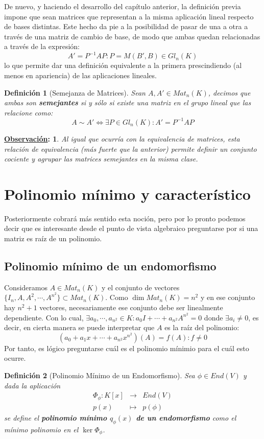 \documentclass[10pt,a4paper,openright]{book}
\theoremstyle{break}
\newtheorem*{defi}{Definición}
\newtheorem*{obs}{\underline{Observación}:}
\begin{document}
De nuevo, y haciendo el desarrollo del capítulo anterior, la definición previa impone que sean matrices que representan a la misma aplicación lineal respecto de bases distintas. Este hecho da pie a la posibilidad de pasar de una a otra a través de una matriz de cambio de base, de modo que ambas quedan relacionadas a través de la expresión:
$$
A'= P^{-1}AP: P=M(B',B)\in Gl_n(K)
$$
lo que permite dar una definición equivalente a la primera prescindiendo (al menos en apariencia) de las aplicaciones lineales.

\begin{defi}[Semejanza de Matrices]
Sean $A,A'\in Mat_{n}(K)$, decimos que ambas son \textbf{semejantes} si y sólo si existe una matriz en el grupo lineal que las relacione como:
$$
A\sim A' \Leftrightarrow \exists P \in Gl_n(K) : A' = P^{-1}AP
$$
\end{defi}

\begin{obs}
Al igual que ocurría con la equivalencia de matrices, esta relación de equivalencia (más fuerte que la anterior) permite definir un conjunto cociente y agrupar las matrices semejantes en la misma clase.
\end{obs}

\section{Polinomio mínimo y característico}
Posteriormente cobrará más sentido esta noción, pero por lo pronto podemos decir que es interesante desde el punto de vista algebraico preguntarse por si una matriz es raíz de un polinomio. 

\subsection{Polinomio mínimo de un endomorfismo}
Consideramos $A\in Mat_n(K)$ y el conjunto de vectores $\{I_n, A, A^2, \cdots, A^{n^2}\}\subset Mat_n(K)$. Como $\dim Mat_n(K)= n^2$ y en ese conjunto hay $n^2+1$ vectores, necesariamente ese conjunto debe ser linealmente dependiente. Con lo cual, $\exists a_0, \cdots, a_{n^2}\in K: a_0I+\cdots+a_{n^2}A^{n^2}=0$ donde $\exists a_i \neq 0$, es decir, en cierta manera se puede interpretar que $A$ es la raíz del polinomio:
$$(a_0+a_1x+\cdots+a_{n^2}x^{n^2})(A)=f(A): f\neq 0$$
Por tanto, es lógico preguntarse cuál es el polinomio mínimio para el cuál esto ocurre.

\begin{defi}[Polinomio Mínimo de un Endomorfismo]
Sea $\phi \in End(V)$ y dada la aplicación
\begin{eqnarray*}
\Phi_\phi:K[x] &\longrightarrow& End(V) \\ p(x) &\longmapsto& p(\phi) 
\end{eqnarray*}
se define el \textbf{polinomio mínimo $q_\phi(x)$ de un endomorfismo} como el mínimo polinomio en el $\ker \Phi_\phi$.
\end{defi}
\end{document}
